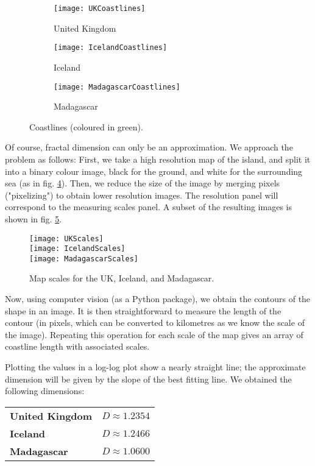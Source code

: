 \begin{figure}[!h]
	\centering
	\begin{subfigure}{.33\textwidth}
		\texttt{[image: UKCoastlines]}
		\centering
		\captionsetup{justification=centering}
		\caption{United Kingdom}
		\label{fig:UKCoastlines}
	\end{subfigure}
	\begin{subfigure}{.33\textwidth}
		\texttt{[image: IcelandCoastlines]}
		\centering
		\captionsetup{justification=centering}
		\caption{Iceland}
		\label{fig:IcelandCoastlines}
	\end{subfigure}
	\begin{subfigure}{.30\textwidth}
		\texttt{[image: MadagascarCoastlines]}
		\centering
		\captionsetup{justification=centering}
		\caption{Madagascar}
		\label{fig:MadagascarCoastlines}
	\end{subfigure}
	\caption{Coastlines (coloured in green).}
	\label{fig:islandsCoastlines}
\end{figure}

Of course, fractal dimension can only be an approximation.
We approach the problem as follows:
First, we take a high resolution map of the island, and split it into a binary colour image, black for the ground, and white for the surrounding sea (as in fig. \ref{fig:islandsCoastlines}).
Then, we reduce the size of the image by merging pixels ("pixelizing") to obtain lower resolution images.
The resolution panel will correspond to the measuring scales panel.
A subset of the resulting images is shown in fig. \ref{fig:islandsScales}.

\begin{figure}[!h]
	\texttt{[image: UKScales]}\\
	\texttt{[image: IcelandScales]}\\
	\texttt{[image: MadagascarScales]}
	\centering
	\caption{Map scales for the UK, Iceland, and Madagascar.}
	\label{fig:islandsScales}
\end{figure}

Now, using computer vision (as a Python package), we obtain the contours of the shape in an image.
It is then straightforward to measure the length of the contour (in pixels, which can be converted to kilometres as we know the scale of the image).
Repeating this operation for each scale of the map gives an array of coastline length with associated scales.

Plotting the values in a log-log plot show a nearly straight line; the approximate dimension will be given by the slope of the best fitting line.
We obtained the following dimensions:\\
\begin{tabular}{l l}\label{table:islandsDimensionRegression}
	\textbf{United Kingdom} & $D \approx 1.2354$ \\
	\textbf{Iceland}        & $D \approx 1.2466$ \\
	\textbf{Madagascar}     & $D \approx 1.0600$
\end{tabular}

